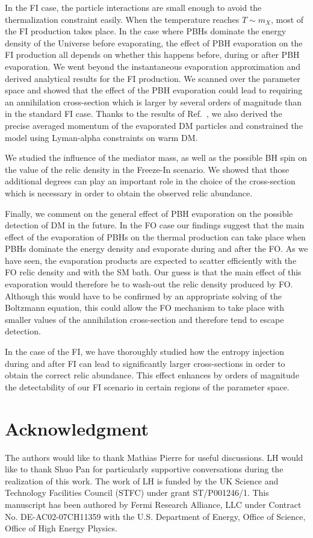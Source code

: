 \documentclass[aps,prd,reprint,twocolumn,preprintnumbers,floatfix,nofootinbib]{revtex4-1}
\begin{document}
In the FI case, the particle interactions are small enough to avoid the thermalization constraint easily. When the temperature reaches $T\sim m_X$, most of the FI production takes place. In the case where PBHs dominate the energy density of the Universe before evaporating, the effect of PBH evaporation on the FI production all depends on whether this happens before, during or after PBH evaporation. We went beyond the instantaneous evaporation approximation and derived analytical results for the FI production. We scanned over the parameter space and showed that the effect of the PBH evaporation could lead to requiring an annihilation cross-section which is larger by several orders of magnitude than in the standard FI case. Thanks to the results of Ref.~\cite{paper1}, we also derived the precise averaged momentum of the evaporated DM particles and constrained the model using Lyman-alpha constraints on warm DM. 

We studied the influence of the mediator mass, as well as the possible BH spin on the value of the relic density in the Freeze-In scenario. We showed that those additional degrees can play an important role in the choice of the cross-section which is necessary in order to obtain the observed relic abundance.

Finally, we comment on the general effect of PBH evaporation on the possible detection of DM in the future. In the FO case our findings suggest that the main effect of the evaporation of PBHs on the thermal production can take place when PBHs dominate the energy density and evaporate during and after the FO. As we have seen, the evaporation products are expected to scatter efficiently with the FO relic density and with the SM bath. Our guess is that the main effect of this evaporation would therefore be to wash-out the relic density produced by FO. Although this would have to be confirmed by an appropriate solving of the Boltzmann equation, this could allow the FO mechanism to take place with smaller values of the annihilation cross-section and therefore tend to escape detection.

In the case of the FI, we have thoroughly studied how the entropy injection during and after FI can lead to significantly larger cross-sections in order to obtain the correct relic abundance. This effect enhances by orders of magnitude the detectability of our FI scenario in certain regions of the parameter space.


\section*{Acknowledgment}
The authors would like to thank Mathias Pierre for useful discussions. LH would like to thank Shuo Pan for particularly supportive conversations during the realization of this work. The work of LH is funded by the UK Science and Technology Facilities Council (STFC) under grant ST/P001246/1. This manuscript has been authored by Fermi Research Alliance, LLC under Contract No. DE-AC02-07CH11359 with the U.S. Department of Energy, Office of Science, Office of High Energy Physics.
\end{document}
